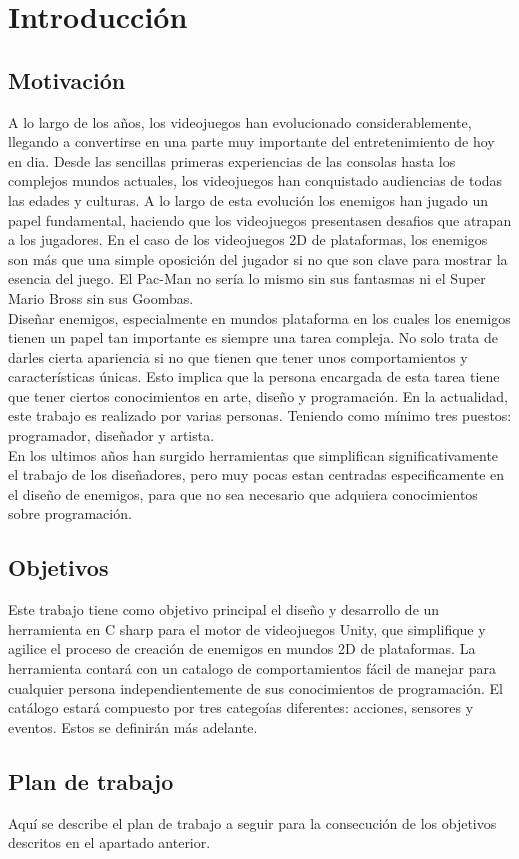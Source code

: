 \chapter{Introducción}
\label{cap:introduccion}


\section{Motivación}
A lo largo de los años, los videojuegos han evolucionado considerablemente, llegando a convertirse en una parte muy importante del entretenimiento de hoy en dia. Desde las sencillas primeras experiencias de las consolas hasta los complejos mundos actuales, los videojuegos han conquistado audiencias de todas las edades y culturas. A lo largo de esta evolución los enemigos han jugado un papel fundamental, haciendo que los videojuegos presentasen desafios que atrapan a los jugadores. 
En el caso de los videojuegos 2D de plataformas, los enemigos son más que una simple oposición del jugador si no que son clave para mostrar la esencia del juego. El Pac-Man no sería lo mismo sin sus fantasmas ni el Super Mario Bross sin sus Goombas. \\
Diseñar enemigos, especialmente en mundos plataforma en los cuales los enemigos tienen un papel tan importante es siempre una tarea compleja. No solo trata de darles cierta apariencia si no que tienen que tener unos comportamientos y características únicas.  Esto implica que la persona encargada de esta tarea tiene que tener ciertos conocimientos en arte, diseño y programación. En la actualidad, este trabajo es realizado por varias personas. Teniendo como mínimo tres puestos: programador, diseñador y artista. \\
En los ultimos años han surgido herramientas que simplifican significativamente el trabajo de los diseñadores, pero muy pocas estan centradas especificamente en el diseño de enemigos, para que no sea necesario que adquiera conocimientos sobre programación. 


\section{Objetivos}
Este trabajo tiene como objetivo principal el diseño y desarrollo de un herramienta en C sharp para el motor de videojuegos Unity, que simplifique y agilice el proceso  de creación de enemigos en mundos 2D de plataformas. La herramienta contará con un catalogo de comportamientos fácil de manejar para cualquier persona independientemente de sus conocimientos de programación. El catálogo estará compuesto por tres categoías diferentes: acciones, sensores y eventos. Estos se definirán más adelante. 

\section{Plan de trabajo}
Aquí se describe el plan de trabajo a seguir para la consecución de los objetivos descritos en el apartado anterior.

